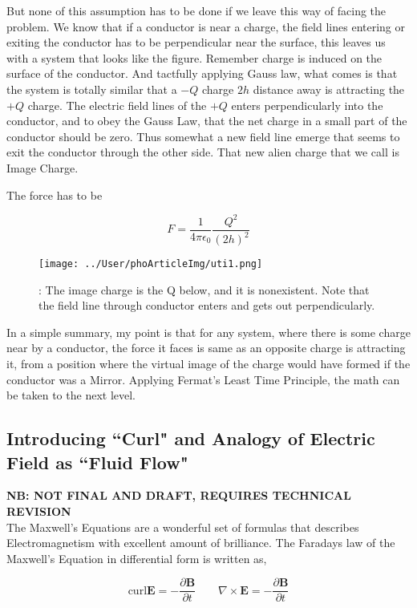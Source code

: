 \documentclass[11pt,a4paper,twocolumn,openright]{article}
\renewcommand{\vec}[1]{\boldsymbol{#1}}
\theoremstyle{definition}
\theoremstyle{definition}
\theoremstyle{definition}
\theoremstyle{definition}
\begin{document}
But none of this assumption has to be done if we leave this way of facing the problem.  We know that if a conductor is near a charge, the field lines entering or exiting the conductor has to be perpendicular near the surface, this leaves us with a system that looks like the figure. Remember charge is induced on the surface of the conductor. And tactfully applying Gauss law, what comes is that the system is totally similar that a $-Q$ charge $2h$ distance away is attracting the $+Q$ charge. The electric field lines of the $+Q$ enters perpendicularly into the conductor, and to obey the Gauss Law, that the net charge in a small part of the conductor should be zero. Thus somewhat a new field line emerge that seems to exit the conductor through the other side. That new alien charge that we call is Image Charge. 
	

The force has to be

	\begin{equation}
	F = \frac{1}{4 \pi \epsilon_0}
	\frac{Q^2}{(2h)^2}
	\end{equation}


\begin{figure}[hbtp]
\centering
\texttt{[image: ../User/phoArticleImg/uti1.png]}
\caption{: The image charge is the Q below, and it is nonexistent. Note that the field line through conductor enters and gets out perpendicularly. }
\end{figure}

In a simple summary, my point is that for any system, where there is some charge near by a conductor, the force it faces is same as an opposite charge is attracting it, from a position where the virtual image of the charge would have formed if the conductor was a Mirror. Applying Fermat's Least Time Principle, the math can be taken to the next level.
\subsection{Introducing ``Curl" and Analogy of Electric Field as ``Fluid Flow"}
{\footnotesize \textbf{NB: NOT FINAL AND DRAFT, REQUIRES TECHNICAL REVISION}}\\
The Maxwell's Equations are a wonderful set of formulas that describes Electromagnetism with excellent amount of brilliance. The Faradays law of the Maxwell's Equation in differential form is written as,


	\begin{equation}
	\text{curl} \vec{E} = - \frac{\partial \vec{B}}{\partial t} 
	\qquad
	\nabla \times \vec{E} = - \frac{\partial \vec{B}}{\partial t} 
	\end{equation}
\end{document}
